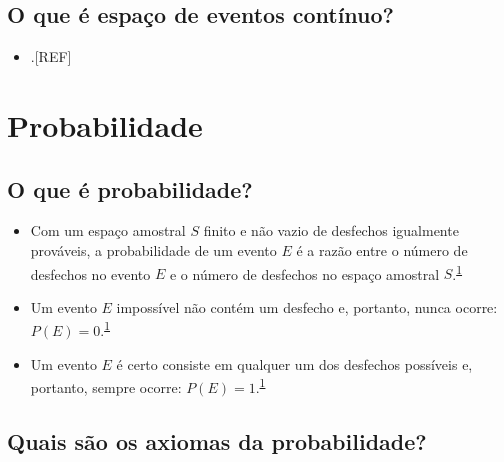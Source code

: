 \documentclass[
  a4paper,
]{book}
\providecommand{\tightlist}{%
  \setlength{\itemsep}{0pt}\setlength{\parskip}{0pt}}
\begin{document}
\hypertarget{o-que-uxe9-espauxe7o-de-eventos-contuxednuo}{%
\subsection{O que é espaço de eventos contínuo?}\label{o-que-uxe9-espauxe7o-de-eventos-contuxednuo}}

\begin{itemize}
\tightlist
\item
  .{[}REF{]}
\end{itemize}

\hypertarget{probabilidade}{%
\section{Probabilidade}\label{probabilidade}}

\hypertarget{o-que-uxe9-probabilidade}{%
\subsection{O que é probabilidade?}\label{o-que-uxe9-probabilidade}}

\begin{itemize}
\item
  Com um espaço amostral \(S\) finito e não vazio de desfechos igualmente prováveis, a probabilidade de um evento \(E\) é a razão entre o número de desfechos no evento \(E\) e o número de desfechos no espaço amostral \(S\).\textsuperscript{\protect\hyperlink{ref-grami2023}{1}}
\item
  Um evento \(E\) impossível não contém um desfecho e, portanto, nunca ocorre: \(P(E)=0\).\textsuperscript{\protect\hyperlink{ref-grami2023}{1}}
\item
  Um evento \(E\) é certo consiste em qualquer um dos desfechos possíveis e, portanto, sempre ocorre: \(P(E)=1\).\textsuperscript{\protect\hyperlink{ref-grami2023}{1}}
\end{itemize}

\hypertarget{quais-suxe3o-os-axiomas-da-probabilidade}{%
\subsection{Quais são os axiomas da probabilidade?}\label{quais-suxe3o-os-axiomas-da-probabilidade}}
\end{document}
